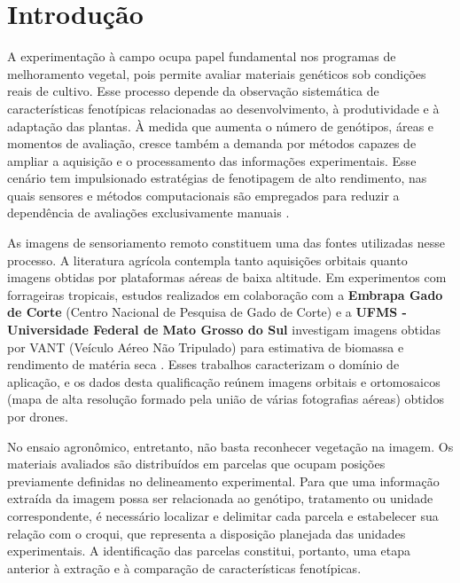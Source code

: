\chapter{Introdu\c{c}\~ao}
\label{cap:introducao}

A experimenta\c{c}\~ao \`a campo ocupa papel fundamental nos programas de melhoramento vegetal, pois permite avaliar materiais gen\'eticos sob condi\c{c}\~oes reais de cultivo. Esse processo depende da observa\c{c}\~ao sistem\'atica de caracter\'isticas fenot\'ipicas relacionadas ao desenvolvimento, \`a produtividade e \`a adapta\c{c}\~ao das plantas. \`A medida que aumenta o n\'umero de gen\'otipos, \'areas e momentos de avalia\c{c}\~ao, cresce tamb\'em a demanda por m\'etodos capazes de ampliar a aquisi\c{c}\~ao e o processamento das informa\c{c}\~oes experimentais. Esse cen\'ario tem impulsionado estrat\'egias de fenotipagem de alto rendimento, nas quais sensores e m\'etodos computacionais s\~ao empregados para reduzir a depend\^encia de avalia\c{c}\~oes exclusivamente manuais \citep{araus2014}.

As imagens de sensoriamento remoto constituem uma das fontes utilizadas nesse processo. A literatura agr\'icola contempla tanto aquisi\c{c}\~oes orbitais quanto imagens obtidas por plataformas a\'ereas de baixa altitude. Em experimentos com forrageiras tropicais, estudos realizados em colabora\c{c}\~ao com a \textbf{Embrapa Gado de Corte} (Centro Nacional de Pesquisa de Gado de Corte) e a \textbf{UFMS - Universidade Federal de Mato Grosso do Sul} investigam imagens obtidas por VANT (Ve\'iculo A\'ereo N\~ao Tripulado) para estimativa de biomassa e rendimento de mat\'eria seca \citep{castro2020,oliveira2021}. Esses trabalhos caracterizam o dom\'inio de aplica\c{c}\~ao, e os dados desta qualifica\c{c}\~ao re\'unem imagens orbitais e ortomosaicos (mapa de alta resolu\c{c}\~ao formado pela uni\~ao de v\'arias fotografias a\'ereas) obtidos por drones.

No ensaio agron\^omico, entretanto, n\~ao basta reconhecer vegeta\c{c}\~ao na imagem. Os materiais avaliados s\~ao distribu\'idos em parcelas que ocupam posi\c{c}\~oes previamente definidas no delineamento experimental. Para que uma informa\c{c}\~ao extra\'ida da imagem possa ser relacionada ao gen\'otipo, tratamento ou unidade correspondente, \'e necess\'ario localizar e delimitar cada parcela e estabelecer sua rela\c{c}\~ao com o croqui, que representa a disposi\c{c}\~ao planejada das unidades experimentais. A identifica\c{c}\~ao das parcelas constitui, portanto, uma etapa anterior \`a extra\c{c}\~ao e \`a compara\c{c}\~ao de caracter\'isticas fenot\'ipicas.

